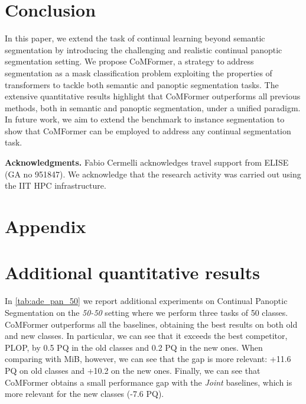 \documentclass[10pt,twocolumn,letterpaper]{article}
\begin{document}
\section{Conclusion} \label{sec:conclusion}
\vspace{-0.5em}
In this paper, we extend the task of continual learning beyond semantic segmentation by introducing the challenging and realistic continual panoptic segmentation setting. We propose CoMFormer, a strategy to address segmentation as a mask classification problem exploiting the properties of transformers to tackle both semantic and panoptic segmentation tasks. 
The extensive quantitative results highlight that CoMFormer outperforms all previous methods, both in semantic and panoptic segmentation, under a unified paradigm. In future work, we aim to extend the benchmark to instance segmentation to show that CoMFormer can be employed to address any continual segmentation task. 

{ \small \textbf{Acknowledgments.}
Fabio Cermelli acknowledges travel support from ELISE (GA no 951847). We acknowledge that the research activity  was carried out using the IIT HPC infrastructure.}

{\small


}

\clearpage
\section*{Appendix}
\appendix
\section{Additional quantitative results}

In \cref{tab:ade_pan_50} we report additional experiments on Continual Panoptic Segmentation on the \textit{50-50} setting where we perform three tasks of 50 classes.
CoMFormer outperforms all the baselines, obtaining the best results on both old and new classes. In particular, we can see that it exceeds the best competitor, PLOP, by 0.5 PQ in the old classes and 0.2 PQ in the new ones. When comparing with MiB, however, we can see that the gap is more relevant: +11.6 PQ on old classes and +10.2 on the new ones. Finally, we can see that CoMFormer obtains a small performance gap with the \textit{Joint} baselines, which is more relevant for the new classes (-7.6 PQ).
\end{document}
